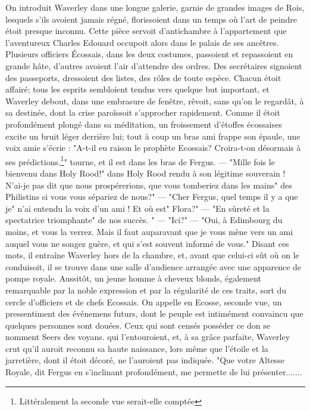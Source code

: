 {On introduit Waverley dans une longue galerie, garnie de grandes images de Rois, lesquels s'ils avoient jamais régné, florissoient dans un temps où l'art de peindre étoit presque inconnu. Cette pièce servoit d'antichambre à l'appartement que l'aventureux Charles Edouard occupoit alors dans le palais de ses ancêtres. Plusieurs officiers Écossais, dans les deux costumes, passoient et repassoient en grande hâte, d'autres avoient l'air d'attendre des ordres. Des secrétaires signoient des passeports, dressoient des listes, des rôles de toute espèce. Chacun étoit affairé; tous les esprits sembloient tendus vers quelque but important, et Waverley debout, dans une embrasure de fenêtre, rêvoit, sans qu'on le regardât, à sa destinée, dont la crise paroîssoit s'approcher rapidement.
Comme il étoit profondément plongé dans sa méditation, un froissement d'étoffes écossaises excite un bruit léger derrière lui; tout à coup un bras ami frappe son épaule, une voix amie s'écrie : "A-t-il eu raison le prophète Ecossais? Croira-t-on désormais à ses prédictions.\footnote{Littéralement la seconde vue serait-elle comptée}"\setcounter{page}{226} tourne, et il est dans les bras de Fergus.
— "Mille fois le bienvenu dans Holy Rood!" dans Holy Rood rendu à son légitime souverain ! N'ai-je pas dit que nous prospérerions, que vous tomberiez dans les mains" des Philistins si vous vous sépariez de nous?"
— "Cher Fergus, quel temps il y a que je" n'ai entendu la voix d'un ami ! Et où est" Flora?"
— "En sûreté et la spectatrice triomphante" de nos succès. "
— "Ici?"
— "Oui, à Edimbourg du moins, et vous la verrez. Mais il faut auparavant que je vous mène vers un ami auquel vous ne songez guère, et qui s'est souvent informé de vous."
Disant ces mots, il entraîne Waverley hors de la chambre, et, avant que celui-ci sût où on le conduisoit, il se trouve dans une salle d'audience arrangée avec une apparence de pompe royale.
Aussitôt, un jeune homme à cheveux blonds, également remarquable par la noble expression et par la régularité de ces traits, sort du cercle d'officiers et de chefs Ecossais.
On appelle en Ecosse, seconde vue, un pressentiment des événemens futurs, dont le peuple est intimément convaincu que quelques personnes sont douées. Ceux qui sont censés posséder ce don se nomment Seers des voyans.\setcounter{page}{227} qui l'entouroient, et, à sa grâce parfaite, Waverley crut qu'il auroit reconnu sa haute naissance, lors même que l'étoile et la jarretière, dont il étoit décoré, ne l'auroient pas indiquée.
"Que votre Altesse Royale, dit Fergus en s'inclinant profondément, me permette de lui présenter.......
}
